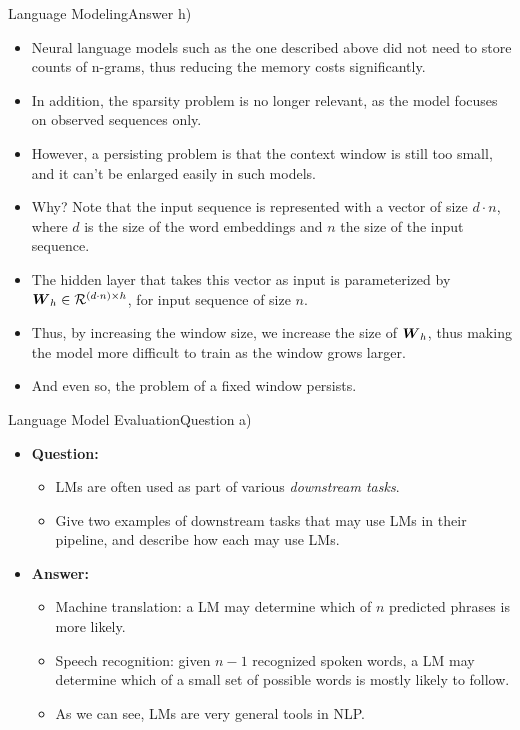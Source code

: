 \documentclass[t]{beamer}
\begin{document}
\begin{frame}{Language Modeling}{Answer h)}
    \begin{itemize}
        \item Neural language models such as the one described above did not
              need to store counts of n-grams, thus reducing the memory costs
              significantly.
        \item In addition, the sparsity problem is no longer relevant, as the
              model focuses on observed sequences only.
        \item However, a persisting problem is that the context window is still
              too small, and it can't be enlarged easily in such models.
        \item Why? Note that the input sequence is represented with a vector of
              size $d\cdot n$, where $d$ is the size of the word embeddings and
              $n$ the size of the input sequence.
        \item The hidden layer that takes this vector as input is parameterized
              by ${\boldsymbol{W}}_h\in\mathcal{R}^{(d\cdot n)\times h}$, for input sequence of
              size $n$.
        \item Thus, by increasing the window size, we increase the size of
              ${\boldsymbol{W}}_h$, thus making the model more difficult to train as the
              window grows larger.
        \item And even so, the problem of a fixed window persists.
    \end{itemize}
\end{frame}

\begin{frame}{Language Model Evaluation}{Question a)}
    \begin{itemize}
        \item \textbf{Question:}
              \begin{itemize}
                  \item LMs are often used as part of various
                        \emph{downstream tasks}.
                  \item Give two examples of downstream tasks
                        that may use LMs in their pipeline, and describe how
                        each may use LMs.
              \end{itemize}
              \pause
        \item \textbf{Answer:}
              \begin{itemize}
                  \item Machine translation: a LM may determine which of $n$
                        predicted phrases is more likely.
                  \item Speech recognition: given $n-1$ recognized spoken words,
                        a LM may determine which of a small set of possible
                        words is mostly likely to follow.
                  \item As we can see, LMs are very general tools in NLP.
              \end{itemize}
    \end{itemize}
\end{frame}
\end{document}
